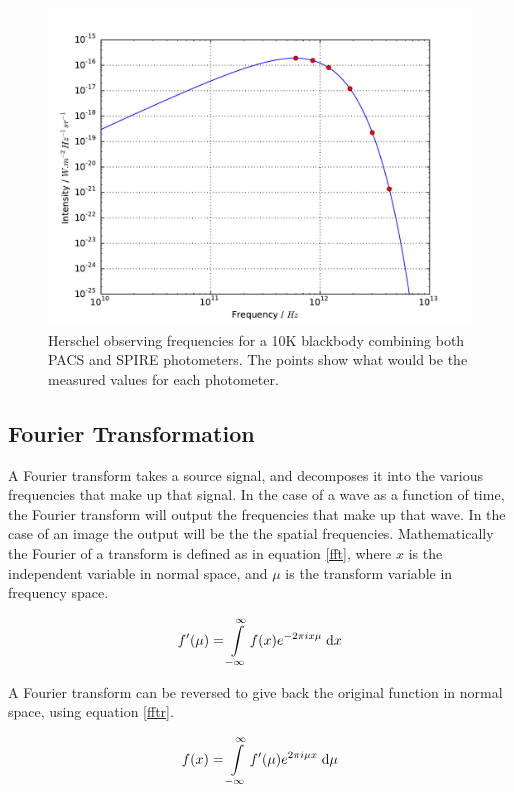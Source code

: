 \begin{figure}[H]
    \centering
    \includegraphics[width=\linewidth]{figures/bb10kHERSCHEL.pdf}
    \caption[Herschel observing frequencies for a 10K blackbody]{Herschel observing frequencies for a 10K blackbody combining both PACS and SPIRE photometers. The points show what would be the measured values for each photometer.}
    \label{herschel-bb}
\end{figure}

\subsection{Fourier Transformation}

A Fourier transform takes a source signal, and decomposes it into the various frequencies that make up that signal. In the case of a wave as a function of time, the Fourier transform will output the frequencies that make up that wave. In the case of an image the output will be the the spatial frequencies. Mathematically the Fourier of a transform is defined as in equation \ref{fft}, where $x$ is the independent variable in normal space, and $\mu$ is the transform variable in frequency space.

\begin{equation}
    f'(\mu) = \int\limits_{-\infty}^{\infty}{ f(x) e^{-2\pi ix\mu}}\;\mathrm{d}x
    \label{fft}
\end{equation}

A Fourier transform can be reversed to give back the original function in normal space, using equation \ref{fftr}.

\begin{equation}
    f(x) = \int\limits_{-\infty}^{\infty}{ f'  (\mu) e^{2\pi i\mu x}}\;\mathrm{d}\mu
    \label{fftr}
\end{equation}

